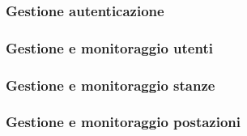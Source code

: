 \subsubsection{Gestione autenticazione}\label{sec:GestioneAutenticazine}


\subsubsection{Gestione e monitoraggio utenti}\label{sec:GMUtenti}


\subsubsection{Gestione e monitoraggio stanze}\label{sec:GMStanze}


\subsubsection{Gestione e monitoraggio postazioni}\label{sec:GMPostazioni}
